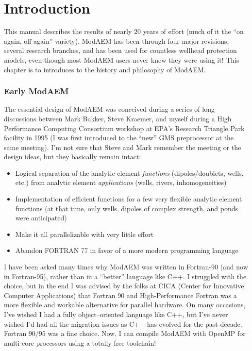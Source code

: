 \chapter{Introduction\label{cha:Introduction} }

This manual describes the results of nearly 20 years of effort (much
of it the ``on again, off again'' variety). ModAEM has been through
four major revisions, several research branches, and has been used
for countless wellhead protection models, even though most ModAEM
users never knew they were using it! This chapter is to introduces
to the history and philosophy of ModAEM. 


\subsection*{Early ModAEM}

The essential design of ModAEM was conceived during a series of long
discussions between Mark Bakker, Steve Kraemer, and myself during
a High Performance Computing Consortium workshop at EPA's Research
Triangle Park facility in 1995 (I was first introduced to the ``new''
GMS preprocessor at the same meeting). I'm not sure that Steve and
Mark remember the meeting or the design ideas, but they basically
remain intact:
\begin{itemize}
\item Logical separation of the analytic element \emph{functions} (dipoles/doublets,
wells, etc.) from analytic element \emph{applications} (wells, rivers,
inhomogeneities)
\item Implementation of efficient functions for a few very flexible analytic
element functions (at that time, only wells, dipoles of complex strength,
and ponds were anticipated)
\item Make it all parallelizable with very little effort
\item Abandon FORTRAN 77 in favor of a more modern programming language
\end{itemize}
I have been asked many times why ModAEM was written in Fortran-90
(and now in Fortran-95), rather than in a ``better'' language like
C++. I struggled with the choice, but in the end I was advised by
the folks at CICA (Center for Innovative Computer Applications) that
Fortran 90 and High-Performance Fortran was a more flexible and workable
alternative for parallel hardware. On many occasions, I've wished
I had a fully object--oriented language like C++, but I've never wished
I'd had all the migration issues as C++ has evolved for the past decade.
Fortran 90/95 was a fine choice. Now, I can compile ModAEM with OpenMP
for multi-core processors using a totally free toolchain!


